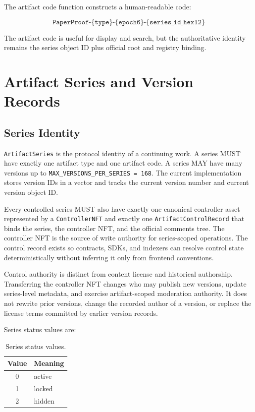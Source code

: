 \documentclass[11pt]{article}
\newcommand{\code}[1]{\texttt{#1}}
\begin{document}
The artifact code function constructs a human-readable code:

\[
\code{PaperProof-\{type\}-\{epoch6\}-\{series\_id\_hex12\}}
\]

The artifact code is useful for display and search, but the authoritative identity remains the series object ID plus official root and registry binding.

\section{Artifact Series and Version Records}

\subsection{Series Identity}

\code{ArtifactSeries} is the protocol identity of a continuing work. A series MUST have exactly one artifact type and one artifact code. A series MAY have many versions up to \code{MAX\_VERSIONS\_PER\_SERIES = 168}. The current implementation stores version IDs in a vector and tracks the current version number and current version object ID.

Every controlled series MUST also have exactly one canonical controller asset
represented by a \code{ControllerNFT} and exactly one \code{ArtifactControlRecord}
that binds the series, the controller NFT, and the official comments tree. The
controller NFT is the source of write authority for series-scoped operations.
The control record exists so contracts, SDKs, and indexers can resolve control
state deterministically without inferring it only from frontend conventions.

Control authority is distinct from content license and historical authorship.
Transferring the controller NFT changes who may publish new versions, update
series-level metadata, and exercise artifact-scoped moderation authority. It
does not rewrite prior versions, change the recorded author of a version, or
replace the license terms committed by earlier version records.

Series status values are:

\begin{table}[htbp]
\centering
\caption{Series status values.}
\begin{tabular}{cl}
\toprule
\textbf{Value} & \textbf{Meaning} \\
\midrule
0 & active \\
1 & locked \\
2 & hidden \\
\bottomrule
\end{tabular}
\end{table}
\end{document}
